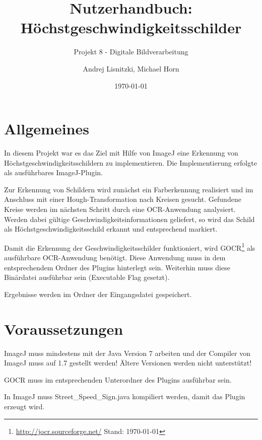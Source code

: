 						

\title{Nutzerhandbuch:  Höchstgeschwindigkeitsschilder}
\subtitle{Projekt 8 - Digitale Bildverarbeitung}

\author{Andrej Lisnitzki, Michael Horn\vspace{4cm}}
\date{\today}

\maketitle

\section{Allgemeines}
In diesem Projekt war es das Ziel mit Hilfe von ImageJ eine Erkennung von Höchstgeschwindigkeitsschildern zu implementieren.
Die Implementierung erfolgte als ausführbares ImageJ-Plugin.

Zur Erkennung von Schildern wird zunächst ein Farberkennung realisiert und im Anschluss mit einer Hough-Transformation nach Kreisen gesucht.
Gefundene Kreise werden im nächsten Schritt durch eine OCR-Anwendung analysiert.
Werden dabei gültige Geschwindigkeitsinformationen geliefert, so wird das Schild als Höchstgeschwindigkeitsschild erkannt und entsprechend markiert.

Damit die Erkennung der Geschwindigkeitsschilder funktioniert, wird GOCR\footnote{\url{http://jocr.sourceforge.net/} Stand: \today} als ausführbare OCR-Anwendung benötigt.
Diese Anwendung muss in dem entsprechendem Ordner des Plugins hinterlegt sein.
Weiterhin muss diese Binärdatei ausführbar sein (Executable Flag gesetzt).

Ergebnisse werden im Ordner der Eingangsdatei gespeichert.

\section{Voraussetzungen}
ImageJ muss mindestens mit der Java Version 7 arbeiten und der Compiler von ImageJ muss auf 1.7 gestellt werden!
Ältere Versionen werden nicht unterstützt!

GOCR muss im entsprechenden Unterordner des Plugins ausführbar sein.

In ImageJ muss Street\_Speed\_Sign.java kompiliert werden, damit das Plugin erzeugt wird.

